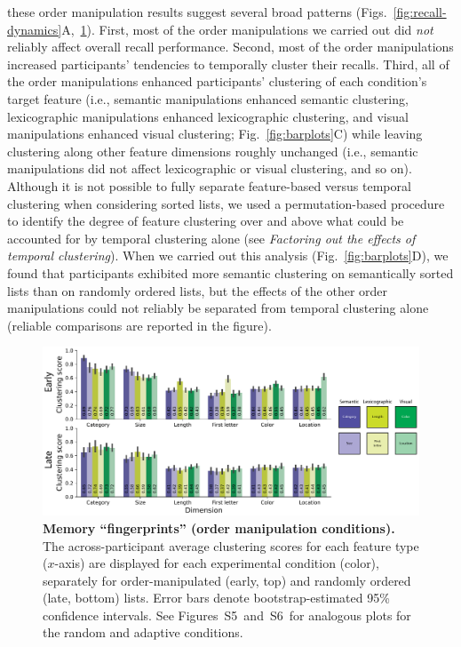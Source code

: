 \documentclass[11pt]{article}
\newcommand{\fingerprintsRandom}{S5}
\newcommand{\fingerprintsAdaptive}{S6}
\begin{document}
these order manipulation results suggest several broad patterns
(Figs.~\ref{fig:recall-dynamics}A,~\ref{fig:fingerprints}). First, most of the
order manipulations we carried out did \textit{not} reliably affect overall
recall performance. Second, most of the order manipulations increased
participants' tendencies to temporally cluster their recalls. Third, all of the
order manipulations enhanced participants' clustering of each condition's
target feature (i.e., semantic manipulations enhanced semantic clustering,
lexicographic manipulations enhanced lexicographic clustering, and visual
manipulations enhanced visual clustering; Fig.~\ref{fig:barplots}C) while
leaving clustering along other feature dimensions roughly unchanged (i.e.,
semantic manipulations did not affect lexicographic or visual clustering, and
so on). Although it is not possible to fully separate feature-based versus
temporal clustering when considering sorted lists, we used a permutation-based
procedure to identify the degree of feature clustering over and above what
could be accounted for by temporal clustering alone (see \textit{Factoring out
the effects of temporal clustering}). When we carried out this analysis
(Fig.~\ref{fig:barplots}D), we found that participants exhibited more semantic
clustering on semantically sorted lists than on randomly ordered lists, but the
effects of the other order manipulations could not reliably be separated from
temporal clustering alone (reliable comparisons are reported in the figure).

\begin{figure}[tp] \centering
    \includegraphics[width=\textwidth]{figures/fingerprints}

\caption{\textbf{Memory ``fingerprints'' (order manipulation conditions).} The
across-participant average clustering scores for each feature type ($x$-axis) are
displayed for each experimental condition (color), separately for order-manipulated
(early, top) and randomly ordered (late, bottom) lists. Error bars
denote bootstrap-estimated 95\% confidence intervals. See
Figures~\fingerprintsRandom~and~\fingerprintsAdaptive~for analogous plots for
the random and adaptive conditions.} \label{fig:fingerprints}

\end{figure}
\end{document}
